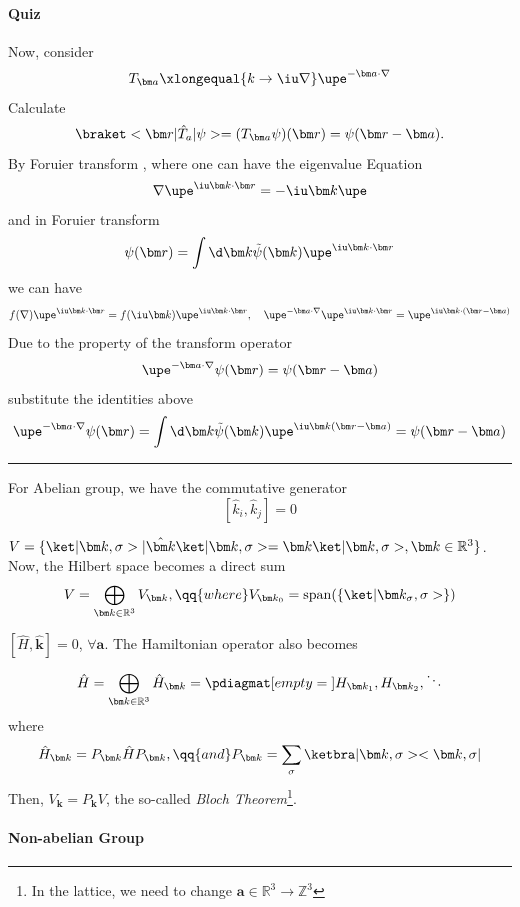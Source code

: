 \paragraph{Quiz}
Now, consider
\[
  T_{\bm a} \xlongequal{k\to\iu\nabla} \upe^{-\bm a \cdot\nabla}
\]
Calculate
\[
  \braket<\bm r|\hat T_a|\psi> = (T_{\bm a}\psi)(\bm r)
= \psi(\bm r - \bm a).
\]
By Foruier transform , where one can have the eigenvalue Equation
\[
  \nabla \upe^{\iu\bm k\cdot\bm r} = -\iu \bm k \upe
\]
and in Foruier transform
\[
  \psi(\bm r) = \int \d\bm k \tilde\psi(\bm k) \upe^{\iu\bm k\cdot\bm r}
\]
we can have
\[
  f(\nabla) \upe^{\iu \bm k\cdot\bm r} = f(\iu\bm k) \upe^{\iu\bm k\cdot\bm r},
  \quad
  \upe^{-\bm a\cdot\nabla} \upe^{\iu\bm k\cdot\bm r}
= \upe^{\iu\bm k\cdot(\bm r-\bm a)}
\]
Due to the property of the transform operator
\[
  \upe^{-\bm a\cdot\nabla} \psi(\bm r) = \psi(\bm r - \bm a)
\]
substitute the identities above
\[
  \upe^{-\bm a\cdot\nabla} \psi(\bm r)
= \int \d\bm k \tilde\psi(\bm k) \upe^{\iu\bm k(\bm r-\bm a)}
= \psi(\bm r - \bm a)
\]
\rule{\linewidth}{1pt}
For Abelian group, we have the commutative generator
\[
  [\hat k_i, \hat k_j] = 0
\]
\begin{enumext}
  \item $V = \{\ket|\bm k, \sigma>|\hat{\bm k} \ket|\bm k,
    \sigma> = \bm k\ket|\bm k, \sigma>, \bm k \in \mathbb R^3\}$.
  Now, the Hilbert space becomes a direct sum
  \[
    V = \bigoplus_{\bm k\in\mathbb R^3} V_{\bm k}, \qq{where}
    V_{\bm k_0} = \operatorname{span}(\{\ket|\bm k_\sigma, \sigma>\})
  \]
  \item $[\hat H, \hat{\bm k}] = 0$, $\forall \bm a$. The Hamiltonian operator
  also becomes
  \[
    \hat H = \bigoplus_{\bm k\in\mathbb R^3} \hat H_{\bm k}
  = \pdiagmat[empty = {}]{H_{\bm k_1}, H_{\bm k_2}, \ddots}
  \]
  where
  \[
    \hat H_{\bm k} = P_{\bm k} \hat H P_{\bm k}, \qq{and}
    P_{\bm k} = \sum_\sigma \ketbra|\bm k,\sigma><\bm k, \sigma|
  \]
  Then, $V_{\bm k} = P_{\bm k}V$, the so-called \emph{Bloch Theorem}\footnote{%
    In the lattice, we need to change $\bm a \in \mathbb R^3 \to \mathbb Z^3$}.
\end{enumext}

\paragraph{Non-abelian Group}

